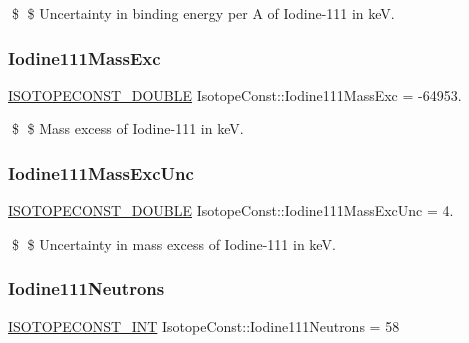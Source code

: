 \$ \$ Uncertainty in binding energy per A of Iodine-\/111 in keV. \mbox{\label{group___isotope_const-_iodine-_i111_gaafc2df74e613ae08c16cbec01c798fef}} 
\subsubsection{\texorpdfstring{Iodine111\+Mass\+Exc}{Iodine111MassExc}}
{\footnotesize\ttfamily \mbox{\hyperlink{group___isotope_const-_macros_ga8f45a7272ce02c0b4c65c44636ed719a}{I\+S\+O\+T\+O\+P\+E\+C\+O\+N\+S\+T\+\_\+\+D\+O\+U\+B\+LE}} Isotope\+Const\+::\+Iodine111\+Mass\+Exc = -\/64953.}

\$ \$ Mass excess of Iodine-\/111 in keV. \mbox{\label{group___isotope_const-_iodine-_i111_ga10bb3e98aea04aaabfecd1376b3f3a70}} 
\subsubsection{\texorpdfstring{Iodine111\+Mass\+Exc\+Unc}{Iodine111MassExcUnc}}
{\footnotesize\ttfamily \mbox{\hyperlink{group___isotope_const-_macros_ga8f45a7272ce02c0b4c65c44636ed719a}{I\+S\+O\+T\+O\+P\+E\+C\+O\+N\+S\+T\+\_\+\+D\+O\+U\+B\+LE}} Isotope\+Const\+::\+Iodine111\+Mass\+Exc\+Unc = 4.}

\$ \$ Uncertainty in mass excess of Iodine-\/111 in keV. \mbox{\label{group___isotope_const-_iodine-_i111_ga06235793db98986bb9f261fc5f0eff0b}} 
\subsubsection{\texorpdfstring{Iodine111\+Neutrons}{Iodine111Neutrons}}
{\footnotesize\ttfamily \mbox{\hyperlink{group___isotope_const-_macros_ga5f18360b3e99483a35c32d789e62621c}{I\+S\+O\+T\+O\+P\+E\+C\+O\+N\+S\+T\+\_\+\+I\+NT}} Isotope\+Const\+::\+Iodine111\+Neutrons = 58}

